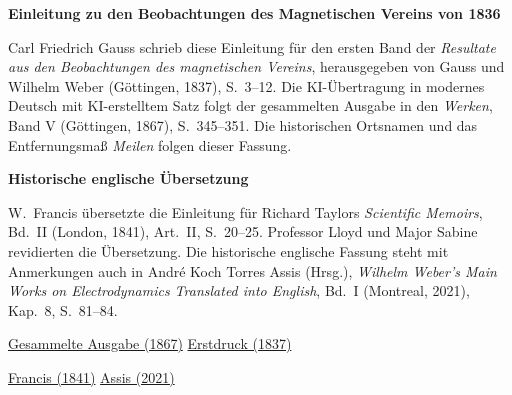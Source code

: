 \clearpage
\thispagestyle{empty}
\begin{center}
\Large\textbf{Einleitung zu den Beobachtungen des Magnetischen Vereins von 1836}
\end{center}

Carl Friedrich Gauss schrieb diese Einleitung für den ersten Band der \textit{Resultate aus den Beobachtungen des magnetischen Vereins}, herausgegeben von Gauss und Wilhelm Weber (Göttingen, 1837), S.~3--12. Die KI-Übertragung in modernes Deutsch mit KI-erstelltem Satz folgt der gesammelten Ausgabe in den \textit{Werken}, Band V (Göttingen, 1867), S.~345--351. Die historischen Ortsnamen und das Entfernungsmaß \textit{Meilen} folgen dieser Fassung.

\medskip\noindent\textbf{Historische englische Übersetzung}\par\smallskip
\noindent W.~Francis übersetzte die Einleitung für Richard Taylors \textit{Scientific Memoirs}, Bd.~II (London, 1841), Art.~II, S.~20--25. Professor Lloyd und Major Sabine revidierten die Übersetzung. Die historische englische Fassung steht mit Anmerkungen auch in André Koch Torres Assis (Hrsg.), \textit{Wilhelm Weber's Main Works on Electrodynamics Translated into English}, Bd.~I (Montreal, 2021), Kap.~8, S.~81--84.

\medskip\noindent
\href{https://gdz.sub.uni-goettingen.de/id/PPN236006339}{Gesammelte Ausgabe (1867)}\quad
\href{https://archive.org/details/ResultateausdenBd1Gaus/page/n9/mode/2up}{Erstdruck (1837)}\par\smallskip\noindent
\href{https://archive.org/details/s1id11857360/page/n82/mode/2up}{Francis (1841)}\quad
\href{https://www.ifi.unicamp.br/~assis/Weber-in-English-Vol-1.pdf\#page=84}{Assis (2021)}
\clearpage

